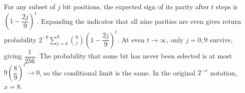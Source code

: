 For any subset of $j$ bit positions, the expected sign of its parity after $t$ steps is $(1 - \dfrac{2 j}{9})^t$. Expanding the indicator that all nine parities are even gives return probability $2^{-9} \sum_{j=0}^9 \binom{9}{j} (1 - \dfrac{2 j}{9})^t$. At even $t\to\infty$, only $j=0,9$ survive, giving $\boxed{\dfrac{1}{256}}$. The probability that some bit has never been selected is at most $9 (\dfrac{8}{9})^t \to 0$, so the conditional limit is the same. In the original $2^{-x}$ notation, $x=8$.
